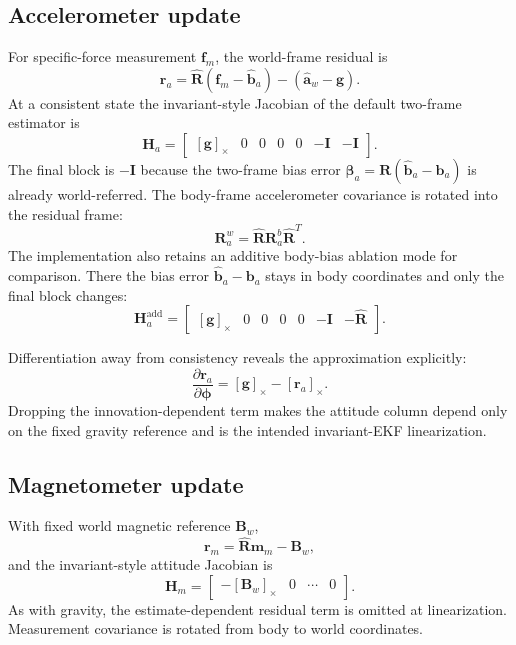 \documentclass[conference]{IEEEtran}
\newcommand{\Skew}[1]{\left[#1\right]_\times}
\theoremstyle{bodysmall}
\begin{document}
\subsection{Accelerometer update}
For specific-force measurement $\bm{f}_m$, the world-frame residual is
\begin{equation}
\bm{r}_a=\hat {\bm{R}}(\bm{f}_m-\hat {\bm{b}}_a)-(\hat {\bm{a}}_w-\bm{g}).
\end{equation}
At a consistent state the invariant-style Jacobian of the default two-frame estimator is
\begin{equation}
\bm{H}_a=\begin{bmatrix}
\Skew{\bm{g}}&0&0&0&0&-\bm{I}&-\bm{I}
\end{bmatrix}.
\end{equation}
The final block is $-\bm{I}$ because the two-frame bias error $\bm{\beta}_a=\bm{R}(\hat {\bm{b}}_a-\bm{b}_a)$ is already world-referred.
The body-frame accelerometer covariance is rotated into the residual frame:
\begin{equation}
\bm{R}_a^w=\hat {\bm{R}} \bm{R}_a^b\hat {\bm{R}}^T.
\end{equation}
The implementation also retains an additive body-bias ablation mode for comparison. There the bias error $\hat {\bm{b}}_a-\bm{b}_a$ stays in body coordinates and only the final block changes:
\begin{equation}
\bm{H}_a^{\mathrm{add}}=\begin{bmatrix}
\Skew{\bm{g}}&0&0&0&0&-\bm{I}&-\hat {\bm{R}}
\end{bmatrix}.
\end{equation}

Differentiation away from consistency reveals the approximation explicitly:
\begin{equation}
\frac{\partial \bm{r}_a}{\partial\bm{\phi}}=\Skew{\bm{g}}-\Skew{\bm{r}_a}.
\end{equation}
Dropping the innovation-dependent term makes the attitude column depend only on the fixed gravity reference and is the intended invariant-EKF linearization.

\subsection{Magnetometer update}
With fixed world magnetic reference $\bm{B}_w$,
\begin{equation}
\bm{r}_m=\hat {\bm{R}}\bm{m}_m-\bm{B}_w,
\end{equation}
and the invariant-style attitude Jacobian is
\begin{equation}
\bm{H}_m=\begin{bmatrix}-\Skew{\bm{B}_w}&0&\cdots&0\end{bmatrix}.
\end{equation}
As with gravity, the estimate-dependent residual term is omitted at linearization. Measurement covariance is rotated from body to world coordinates.
\end{document}
